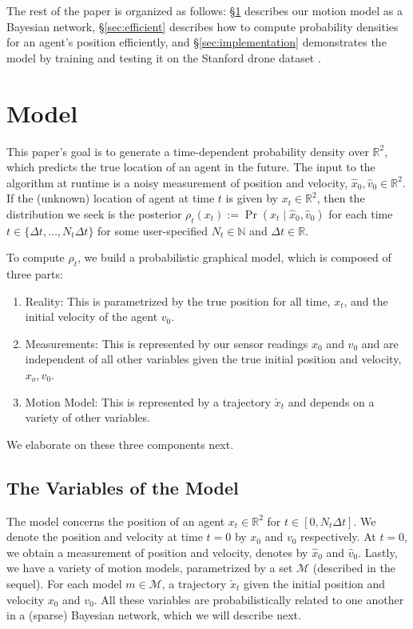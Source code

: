 \documentclass[letterpaper,10pt,conference]{ieeetran}
\begin{document}
The rest of the paper is organized as follows: \S \ref{sec:model} describes our motion model as a Bayesian network, \S \ref{sec:efficient} describes how to compute probability densities for an agent's position efficiently, and \S \ref{sec:implementation} demonstrates the model by training and testing it on the Stanford drone dataset \cite{Robicquet2016}.

\section{Model}\label{sec:model}
This paper's goal is to generate a time-dependent probability density over $\mathbb{R}^2$, which predicts the true location of an agent in the future.
The input to the algorithm at runtime is a noisy measurement of position and velocity, $\hat{x}_0, \hat{v}_0 \in \mathbb{R}^2$.
If the (unknown) location of agent at time $t$ is given by $x_t \in \mathbb{R}^2$, then the distribution we seek is the posterior $\rho_t(x_t) := \Pr( x_t \mid \hat{x}_0, \hat{v}_0 )$ for each time $t \in \{\Delta t, \dots, N_t \Delta t \}$ for some user-specified $N_t \in \mathbb{N}$ and $\Delta t \in \mathbb{R}$.

To compute $\rho_t$, we build a probabilistic graphical model, which is composed of three parts:
\begin{enumerate}
	\item Reality: This is parametrized by the true position for all time, $x_t$, and the initial velocity of the agent $v_0$.
	\item Measurements:  This is represented by our sensor readings $\hat{x}_0$ and $\hat{v}_0$ and are independent of all other variables given the true initial position and velocity, $x_o, v_0$.
	\item Motion Model: This is represented by a trajectory $\check{x}_t$ and depends on a variety of other variables.
\end{enumerate}
We elaborate on these three components next.

\subsection{The Variables of the Model}
The model concerns the position of an agent $x_t \in \mathbb{R}^2$ for $t \in [0,N_t \Delta t]$.
We denote the position and velocity at time $t=0$ by $x_0$ and $v_0$ respectively.
At $t=0$, we obtain a measurement of position and velocity, denotes by $\hat{x}_0$ and $\hat{v}_0$.
Lastly, we have a variety of motion models, parametrized by a set $\mathcal{M}$ (described in the sequel).
For each model $m \in \mathcal{M}$, a trajectory $\check{x}_t$ given the initial position and velocity $x_0$ and $v_0$.
All these variables are probabilistically related to one another in a (sparse) Bayesian network, which we will describe next.
\end{document}
